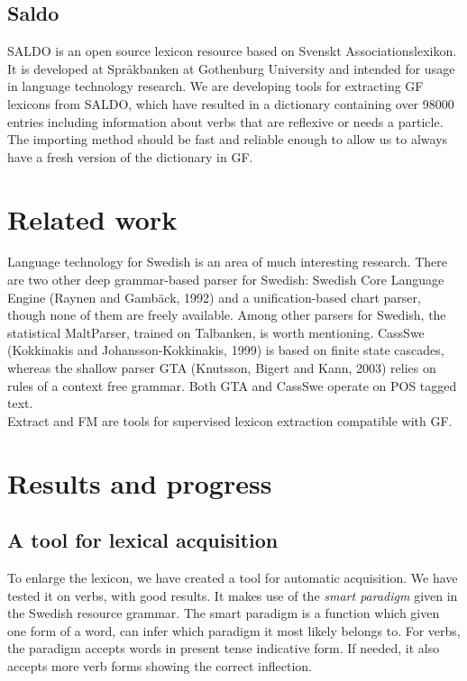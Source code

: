 \documentclass[submission]{eptcs} %
\begin{document}
\subsection{Saldo}
SALDO\cite{saldo} is an open source lexicon resource
based on Svenskt Associationslexikon. It is
developed at Språkbanken at Gothenburg University
and intended for usage in language technology
research. 
We are developing tools for extracting GF lexicons
from SALDO, which have resulted in a dictionary containing
over 98000 entries including information about verbs that
are reflexive or needs a particle.
The importing method should be fast and reliable
enough to allow us to always have a fresh version of the dictionary
in GF.

\section{Related work}
Language technology for Swedish is an area of much interesting research.
There are two other deep grammar-based parser for Swedish:
Swedish Core Language Engine (Raynen and Gambäck, 1992) and a
unification-based chart parser\cite{wiren},
though none of them are freely available.
Among other parsers for Swedish, the statistical MaltParser\cite{malt},
trained on Talbanken, is worth mentioning. 
CassSwe (Kokkinakis and Johansson-Kokkinakis, 1999) is based on finite state cascades,
whereas the shallow parser GTA (Knutsson, Bigert and Kann, 2003) relies on rules of 
a context free grammar. Both GTA and CassSwe operate on POS tagged text.\\
Extract and FM\cite{MarkusForsberg2007} are tools for supervised lexicon
extraction compatible with GF.

\section{Results and progress}
\label{sec:progress}
\subsection{A tool for lexical acquisition}
To enlarge the lexicon, 
we have created a tool for automatic acquisition. We have
tested it on verbs, with good results. It makes use of
the \emph{smart paradigm} given in the Swedish resource grammar.
The smart paradigm is a function which given one form of a word, can
infer which paradigm it most likely belongs to.
For verbs, the paradigm accepts words in present tense indicative form.
If needed, it also accepts more verb forms showing the correct inflection.
\end{document}
